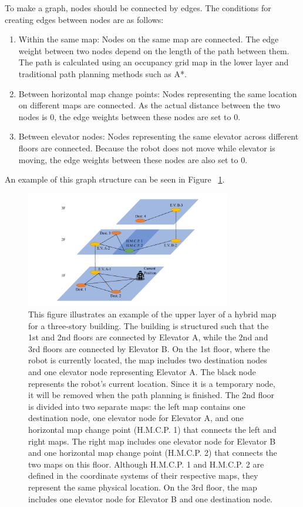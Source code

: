\documentclass[en]{snu-cse-bsc-thesis}
\begin{document}
To make a graph, nodes should be connected by edges. The conditions for creating edges between nodes are as follows:
\begin{enumerate}
  \item Within the same map: Nodes on the same map are connected. 
  The edge weight between two nodes depend on the length of the path between them. 
  The path is calculated using an occupancy grid map in the lower layer and traditional path planning methods such as A*.
  \item Between horizontal map change points: Nodes representing the same location on different maps are connected. As the actual distance between the two nodes is 0, the edge weights between these nodes are set to 0.
  \item Between elevator nodes: Nodes representing the same elevator across different floors are connected. 
  Because the robot does not move while elevator is moving, the edge weights between these nodes are also set to 0.
\end{enumerate}
An example of this graph structure can be seen in Figure ~\ref{fig:graph_outline}.
\begin{figure}[!t]
  \centering
  \includegraphics[width=0.8\textwidth]{gcg graph outline.pdf}
  \caption[An example of the upper layer of a hybrid map]{This figure illustrates an example of the upper layer of a hybrid map for a three-story building. The building is structured such that the 1st and 2nd floors are connected by Elevator A, while the 2nd and 3rd floors are connected by Elevator B. On the 1st floor, where the robot is currently located, the map includes two destination nodes and one elevator node representing Elevator A. The black node represents the robot's current location. Since it is a temporary node, it will be removed when the path planning is finished. The 2nd floor is divided into two separate maps: the left map contains one destination node, one elevator node for Elevator A, and one horizontal map change point (H.M.C.P. 1) that connects the left and right maps. The right map includes one elevator node for Elevator B and one horizontal map change point (H.M.C.P. 2) that connects the two maps on this floor. Although H.M.C.P. 1 and H.M.C.P. 2 are defined in the coordinate systems of their respective maps, they represent the same physical location. On the 3rd floor, the map includes one elevator node for Elevator B and one destination node.}
  \label{fig:graph_outline}
\end{figure}
\end{document}
